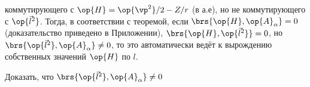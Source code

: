 коммутирующего с $\op{H} = \op{\vp^2}/2 - Z/r$ (в а.е), но не коммутирующего с $\op{\vec{l}^2}$. Тогда, в соответствии с теоремой, если $\brs{\op{H}, \op{A}_\alpha} = 0$ (доказательство приведено в Приложении), $\brs{\op{H}, \op{\vec{l}^2}} = 0$, но $\brs{\op{\vec{l}^2}, \op{A}_\alpha} \neq 0$, то это автоматически ведёт к вырождению собственных значений $\op{H}$ по $l$.

\begin{excr}
Доказать, что $\brs{\op{\vec{l}^2}, \op{A}_\alpha} \neq 0$
\end{excr}
